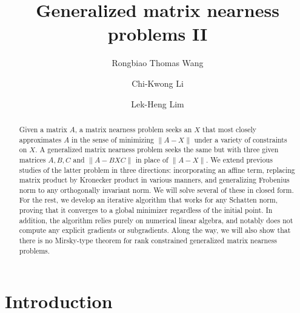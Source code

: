 \documentclass[11pt,reqno]{amsart}
\theoremstyle{definition}
\numberwithin{equation}{section}
\begin{document}
\title{Generalized matrix nearness problems II}
\author{Rongbiao Thomas Wang}
\address{Computational and Applied Mathematics, University of Chicago, Chicago, IL 60637}

\author{Chi-Kwong Li}
\address{Department of Mathematics, College of William and Mary, Williamsburg, Virginia 23187}

\author{Lek-Heng Lim}
\address{Computational and Applied Mathematics, University of Chicago, Chicago, IL 60637}

\begin{abstract}
Given a matrix $A$, a matrix nearness problem seeks an $X$ that most closely approximates $A$ in the sense of minimizing  $\lVert A - X\rVert$ under a variety of constraints on $X$. A generalized matrix nearness problem seeks the same but with three given matrices $A,B,C$ and $\lVert A - BXC\rVert$ in place of $\lVert A - X\rVert$. We extend previous studies of the latter problem in three directions: incorporating an affine term, replacing matrix product by Kronecker product in various manners, and generalizing Frobenius norm to any orthogonally invariant norm. We will solve several of these in closed form. For the rest, we develop an iterative algorithm that works for any Schatten norm, proving that it converges to a global minimizer regardless of the initial point. In addition, the algorithm relies purely on numerical linear algebra, and notably does not compute any explicit gradients or subgradients. Along the way, we will also show that there is no Mirsky-type theorem for rank constrained generalized matrix nearness problems.
\end{abstract}

\maketitle

\section{Introduction}\label{sec:intro}
\end{document}
